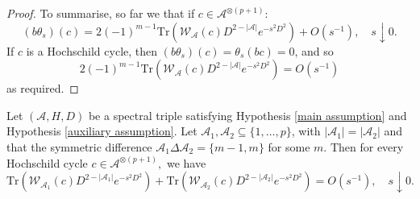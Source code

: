 \begin{proof}
        To summarise, so far we that if $c \in \mathcal{A}^{\otimes (p+1)}$: 
        \begin{equation*}
            (b\theta_s)(c) = 2(-1)^{m-1}\mathrm{Tr}(\mathcal{W}_{\mathscr{A}}(c)D^{2-|\mathscr{A}|}e^{-s^2D^2})+O(s^{-1}),\quad s\downarrow 0.
        \end{equation*}
        If $c$ is a Hochschild cycle, then $(b\theta_s)(c) = \theta_s(bc) = 0$, and so
        \begin{equation*}
            2(-1)^{m-1}\mathrm{Tr}(\mathcal{W}_{\mathscr{A}}(c)D^{2-|\mathscr{A}|}e^{-s^2D^2}) = O(s^{-1})
        \end{equation*}
        as required.
    \end{proof}

    \begin{lem}\label{kogom3} 
        Let $(\mathcal{A},H,D)$ be a spectral triple satisfying Hypothesis \ref{main assumption} and Hypothesis \ref{auxiliary assumption}. 
        Let $\mathscr{A}_1,\mathscr{A}_2 \subseteq \{1,\ldots,p\}$, with $|\mathscr{A}_1|=|\mathscr{A}_2|$ and that the symmetric difference $\mathscr{A}_1\Delta\mathscr{A}_2=\{m-1,m\}$ for some $m.$ 
        Then for every Hochschild cycle $c\in\mathcal{A}^{\otimes (p+1)},$ we have
        \begin{equation*}
            \mathrm{Tr}(\mathcal{W}_{\mathscr{A}_1}(c)D^{2-|\mathscr{A}_1|}e^{-s^2D^2})+\mathrm{Tr}(\mathcal{W}_{\mathscr{A}_2}(c)D^{2-|\mathscr{A}_2|}e^{-s^2D^2}) = O(s^{-1}),\quad s\downarrow0.
        \end{equation*}
    \end{lem}
